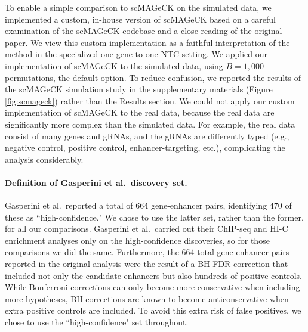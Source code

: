 \documentclass{article}
\begin{document}
To enable a simple comparison to scMAGeCK on the simulated data, we implemented a custom, in-house version of scMAGeCK based on a careful examination of the scMAGeCK codebase and a close reading of the original paper. We view this custom implementation as a faithful interpretation of the method in the specialized one-gene to one-NTC setting. We applied our implementation of scMAGeCK to the simulated data, using $B = 1,000$ permutations, the default option. To reduce confusion, we reported the results of the scMAGeCK simulation study in the supplementary materials (Figure \ref{fig:scmageck}) rather than the Results section. We could not apply our custom implementation of scMAGeCK to the real data, because the real data are significantly more complex than the simulated data. For example, the real data consist of many genes and gRNAs, and the gRNAs are differently typed (e.g., negative control, positive control, enhancer-targeting, etc.), complicating the analysis considerably.

\paragraph{Definition of Gasperini et al.\ discovery set.}

Gasperini et al.\ reported a total of 664 gene-enhancer pairs, identifying 470 of these as ``high-confidence." We chose to use the latter set, rather than the former, for all our comparisons. Gasperini et al.\ carried out their ChIP-seq and HI-C enrichment analyses only on the high-confidence discoveries, so for those comparisons we did the same. Furthermore, the 664 total gene-enhancer pairs reported in the original analysis were the result of a BH FDR correction that included not only the candidate enhancers but also hundreds of positive controls. While Bonferroni corrections can only become more conservative when including more hypotheses, BH corrections are known to become anticonservative when extra positive controls are included\cite{FR01}. To avoid this extra risk of false positives, we chose to use the ``high-confidence" set throughout.
\end{document}
